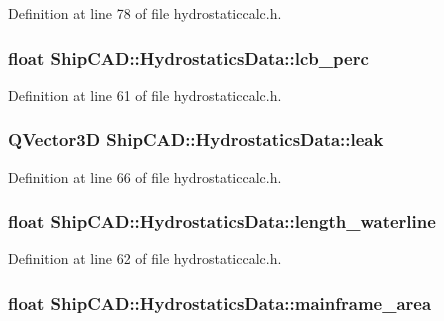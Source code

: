 Definition at line 78 of file hydrostaticcalc.\-h.

\hypertarget{structShipCAD_1_1HydrostaticsData_a783b71d811732bbc002b52f21d63c83a}{
\subsubsection[{lcb\-\_\-perc}]{\setlength{\rightskip}{0pt plus 5cm}float Ship\-C\-A\-D\-::\-Hydrostatics\-Data\-::lcb\-\_\-perc}}\label{structShipCAD_1_1HydrostaticsData_a783b71d811732bbc002b52f21d63c83a}


Definition at line 61 of file hydrostaticcalc.\-h.

\hypertarget{structShipCAD_1_1HydrostaticsData_a1132babc4274499418c2dc8ea6f86314}{
\subsubsection[{leak}]{\setlength{\rightskip}{0pt plus 5cm}Q\-Vector3\-D Ship\-C\-A\-D\-::\-Hydrostatics\-Data\-::leak}}\label{structShipCAD_1_1HydrostaticsData_a1132babc4274499418c2dc8ea6f86314}


Definition at line 66 of file hydrostaticcalc.\-h.

\hypertarget{structShipCAD_1_1HydrostaticsData_ae65aa54bcbfb059f11aa174cfaa0447b}{
\subsubsection[{length\-\_\-waterline}]{\setlength{\rightskip}{0pt plus 5cm}float Ship\-C\-A\-D\-::\-Hydrostatics\-Data\-::length\-\_\-waterline}}\label{structShipCAD_1_1HydrostaticsData_ae65aa54bcbfb059f11aa174cfaa0447b}


Definition at line 62 of file hydrostaticcalc.\-h.

\hypertarget{structShipCAD_1_1HydrostaticsData_ab2b49d5dea89ae998116c8ff4cac2b53}{
\subsubsection[{mainframe\-\_\-area}]{\setlength{\rightskip}{0pt plus 5cm}float Ship\-C\-A\-D\-::\-Hydrostatics\-Data\-::mainframe\-\_\-area}}\label{structShipCAD_1_1HydrostaticsData_ab2b49d5dea89ae998116c8ff4cac2b53}


